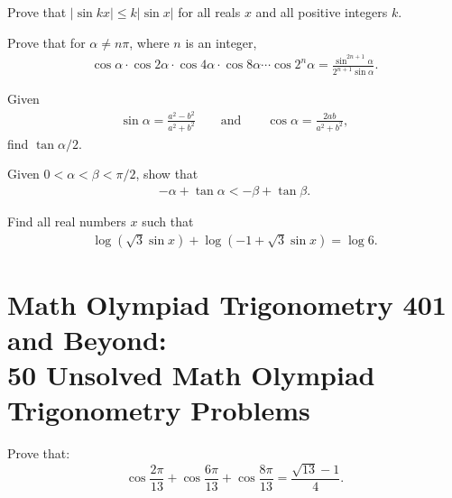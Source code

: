 \documentclass[12pt,a4paper]{memoir}
\theoremstyle{definition}
\begin{document}
\begin{question}[name={Nonroutine III}]
	Prove that $|\sin kx| \leq k | \sin x|$ for all reals $x$ and all positive integers $k$.
\end{question}

\begin{question}[name={Nonroutine IV}]
	Prove that for $\alpha \neq n\pi$, where $n$ is an integer,
	\begin{align*}
		\cos \alpha \cdot \cos 2\alpha \cdot \cos 4\alpha \cdot \cos 8\alpha \cdots \cos 2^n\alpha = \frac{\sin^{2n+1}\alpha}{2^{n+1}\sin \alpha}.
	\end{align*}
\end{question}

\begin{question}[name={Nonroutine V}]
	Given
	\begin{align*}
		\sin \alpha = \frac{a^2 - b^2}{a^2 + b^2} \qquad \text{and} \qquad \cos \alpha = \frac{2ab}{a^2+b^2},
	\end{align*}
	find $\tan \alpha/2$.
\end{question}



\begin{question}[name={Nonroutine VI}]
	Given $0<\alpha<\beta<\pi/2$, show that
	\begin{align*}
		-\alpha + \tan \alpha < -\beta + \tan \beta.
	\end{align*}
\end{question}



\begin{question}[name={Nonroutine VII}]
	Find all real numbers $x$ such that
	\begin{align*}
		\log(\sqrt 3 \sin x) + \log(-1+\sqrt 3 \sin x) = \log 6.
	\end{align*}
\end{question}

\newpage
\section{Math Olympiad Trigonometry 401 and Beyond:\\ 50 Unsolved Math Olympiad Trigonometry Problems}

\begin{question} Prove that:
	\[\cos\frac{2\pi}{13}+\cos\frac{6\pi}{13}+\cos\frac{8\pi}{13}=\frac{\sqrt{13}-1}{4}.\]
\end{question}
\end{document}
